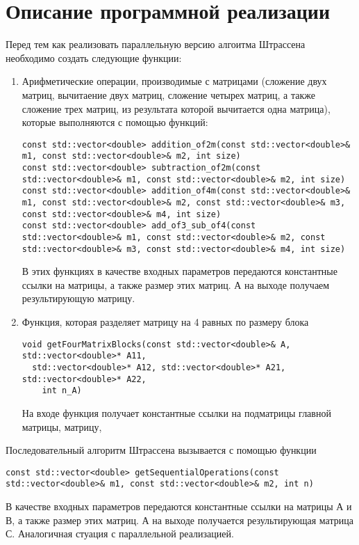 \documentclass{report}
\begin{document}
\section*{Описание программной реализации}
Перед тем как реализовать параллельную версию алгоитма Штрассена необходимо создать следующие функции:
\begin {enumerate}
\item Арифметические операции, производимые с матрицами (сложение двух матриц, вычитаение двух матриц, сложение четырех матриц, а также сложение трех матриц, из результата которой вычитается одна матрица), которые выполняются с помощью функций:
\begin{lstlisting}
const std::vector<double> addition_of2m(const std::vector<double>& m1, const std::vector<double>& m2, int size)
const std::vector<double> subtraction_of2m(const std::vector<double>& m1, const std::vector<double>& m2, int size)
const std::vector<double> addition_of4m(const std::vector<double>& m1, const std::vector<double>& m2, const std::vector<double>& m3, const std::vector<double>& m4, int size)
const std::vector<double> add_of3_sub_of4(const std::vector<double>& m1, const std::vector<double>& m2, const std::vector<double>& m3, const std::vector<double>& m4, int size) 
\end{lstlisting}
В этих функциях в качестве входных параметров передаются константные ссылки на матрицы, а также размер этих матриц. А на выходе получаем результирующую матрицу.
\item Функция, которая разделяет матрицу на 4 равных по размеру блока
\begin{lstlisting}
void getFourMatrixBlocks(const std::vector<double>& A, std::vector<double>* A11,
  std::vector<double>* A12, std::vector<double>* A21, std::vector<double>* A22,
    int n_A)
\end{lstlisting}
На входе функция получает константные ссылки на подматрицы главной матрицы, матрицу,
\end{enumerate}
Последовательный алгоритм Штрассена вызывается с помощью функции
\begin{lstlisting}
const std::vector<double> getSequentialOperations(const std::vector<double>& m1, const std::vector<double>& m2, int n)
\end{lstlisting}
\par В качестве входных параметров передаются константные ссылки на матрицы А и В, а также размер этих матриц. А на выходе получается результирующая матрица С.
Аналогичная стуация с параллельной реализацией.
\newpage
\end{document}
